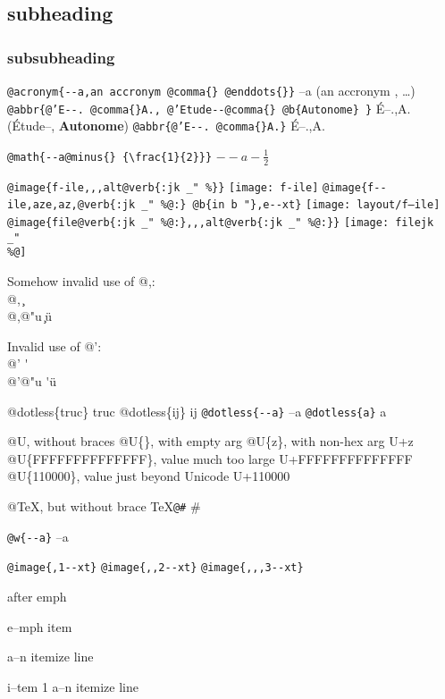 \documentclass{book}
\renewcommand{\includegraphics}[1]{\fbox{FIG #1}}
\begin{document}
\subsection*{subheading}

\subsubsection*{subsubheading}


\texttt{@acronym\{{-}{-}a,an accronym @comma\{\} @enddots\{\}\}} --a (an accronym , \dots{})
\texttt{@abbr\{@'E{-}{-}. @comma\{\}A., @'Etude{-}{-}@comma\{\} @b\{Autonome\} \}} \'{E}--.\@ ,A.\@ (\'{E}tude--, \textbf{Autonome})
\texttt{@abbr\{@'E{-}{-}. @comma\{\}A.\}} \'{E}--.\@ ,A.\@

\texttt{@math\{{-}{-}a@minus\{\} \{\textbackslash{}frac\{1\}\{2\}\}\}} $--a- {\frac{1}{2}}$

\texttt{@image\{f-ile,,,alt@verb\{:jk \_" \%\@\}\}} \texttt{[image: f-ile]}
\texttt{@image\{f{-}{-}ile,aze,az,@verb\{:jk \_" \%@:\} @b\{in b "\},e{-}{-}xt\}} \texttt{[image: layout/f--ile]}
\texttt{@image\{file@verb\{:jk \_" \%@:\},,,alt@verb\{:jk \_" \%@:\}\}} \texttt{[image: filejk \\\_" \\\%@]}




Somehow invalid use of @,:\leavevmode{}\\
@, \c{}
\leavevmode{}\\
@,@"u \c{}\"{u}

Invalid use of @':\leavevmode{}\\
@' \'{}
\leavevmode{}\\
@'@"u \'{}\"{u}

@dotless\{truc\} truc
@dotless\{ij\} ij
\texttt{@dotless\{{-}{-}a\}} --a
\texttt{@dotless\{a\}} a

@U, without braces @U\{\}, with empty arg 
@U\{z\}, with non-hex arg U+z
@U\{FFFFFFFFFFFFFF\}, value much too large U+FFFFFFFFFFFFFF
@U\{110000\}, value just beyond Unicode U+110000

@TeX, but without brace \TeX{}\texttt{@\#} \#

\texttt{@w\{{-}{-}a\}} \hbox{--a}

\texttt{@image\{,1{-}{-}xt\}} 
\texttt{@image\{,,2{-}{-}xt\}} 
\texttt{@image\{,,,3{-}{-}xt\}} 


\emph{} after emph 

e--mph item

\textbullet{} a--n itemize line 

i--tem 1
\textbullet{} a--n itemize line 
\end{document}
